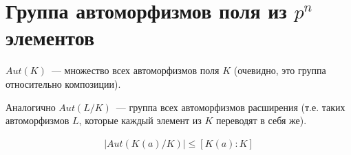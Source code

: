 \section{Группа автоморфизмов поля из $p^n$ элементов}
\begin{conj}
    $Aut(K)$~--- множество всех автоморфизмов поля $K$ (очевидно, это группа относительно композиции).

    Аналогично $Aut(L/K)$~--- группа всех автоморфизмов расширения (т.е. таких автоморфизмов $L$, которые каждый элемент из $K$ переводят в себя же).
\end{conj}
\begin{lemma}
    \begin{gather*}
        \left| Aut(K(a) / K) \right| \le [K(a) : K]
    \end{gather*}
\end{lemma}
